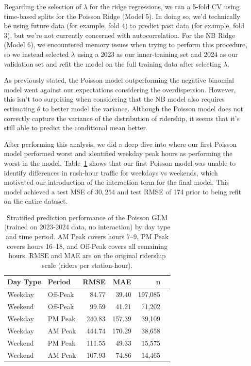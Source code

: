 \documentclass[11pt, letterpaper]{article}
\begin{document}
Regarding the selection of $\lambda$ for the ridge regressions, we ran a 5-fold CV using time-based splits for the Poisson Ridge (Model 5). In doing so, we'd technically be using future data (for example, fold 4) to predict past data (for example, fold 3), but we're not currently concerned with autocorrelation. For the NB Ridge (Model 6), we encountered memory issues when trying to perform this procedure, so we instead selected $\lambda$ using a 2023 as our inner-training set and 2024 as our validation set and refit the model on the full training data after selecting $\lambda$.

As previously stated, the Poisson model outperforming the negative binomial model went against our expectations considering the overdispersion. However, this isn't too surprising when considering that the NB model also requires estimating $\theta$ to better model the variance. Although the Poisson model does not correctly capture the variance of the distribution of ridership, it seems that it's still able to predict the conditional mean better.

After performing this analysis, we did a deep dive into where our first Poisson model performed worst and identified weekday peak hours as performing the worst in the model. Table~\ref{tab:stratified_performance} shows that our first Poisson model was unable to identify differences in rush-hour traffic for weekdays vs weekends, which motivated our introduction of the interaction term for the final model. This model achieved a test MSE of $30{,}254$ and test RMSE of 174 prior to being refit on the entire dataset.

\begin{table}[h]
\centering
\begin{tabular}{llrrrr}
\hline
\textbf{Day Type} & \textbf{Period} & \textbf{RMSE} & \textbf{MAE} & \textbf{n} \\
\hline
Weekday & Off-Peak &  84.77 &  39.40 & 197{,}085 \\
Weekend & Off-Peak &  99.59 &  41.21 &  71{,}202 \\
Weekday & PM Peak  & 240.83 & 157.39 &  39{,}109 \\
Weekday & AM Peak  & 444.74 & 170.29 &  38{,}658 \\
Weekend & PM Peak  & 111.55 &  49.33 &  15{,}575 \\
Weekend & AM Peak  & 107.93 &  74.86 &  14{,}465 \\
\hline
\end{tabular}
\caption{Stratified prediction performance of the Poisson GLM (trained on 2023-2024 data, no interaction) by day type and time period. AM Peak covers hours 7--9, PM Peak covers hours 16--18, and Off-Peak covers all remaining hours. RMSE and MAE are on the original ridership scale (riders per station-hour).}
\label{tab:stratified_performance}
\end{table}
\end{document}
